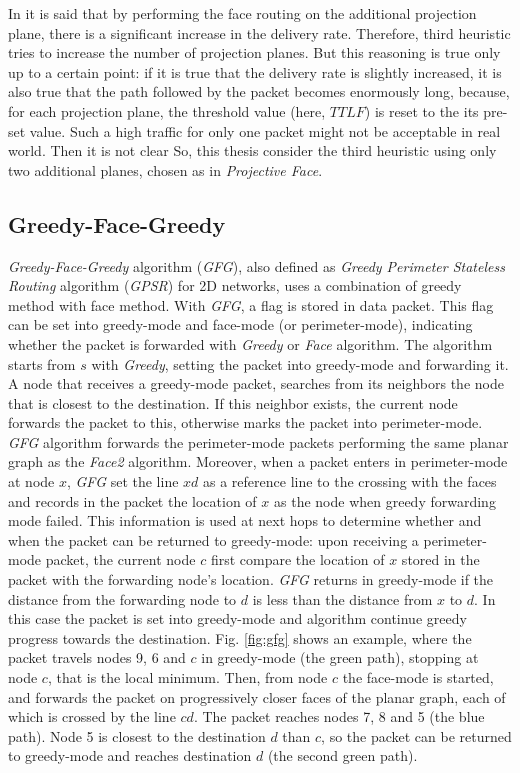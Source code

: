 \documentclass[journal,comsoc]{IEEEtran}
\begin{document}
In \cite{kao:nearly} it is said that by performing the face routing on the additional projection plane, there is a significant increase in the delivery rate. Therefore, third heuristic tries to increase the number of projection planes. But this reasoning is true only up to a certain point: if it is true that the delivery rate is slightly increased, it is also true that the path followed by the packet becomes enormously long, because, for each projection plane, the threshold value (here, \(TTLF\)) is reset to the its pre-set value. Such a high traffic for only one packet might not be acceptable in real world. Then it is not clear So, this thesis consider the third heuristic using only two additional planes, chosen as in \emph{Projective Face}.


\subsection{Greedy-Face-Greedy}
\emph{Greedy-Face-Greedy} algorithm (\emph{GFG}), also defined as \emph{Greedy Perimeter Stateless Routing} algorithm (\emph{GPSR}) for 2D networks, uses a combination of greedy method with face method.
With \emph{GFG}, a flag is stored in data packet. This flag can be set into greedy-mode and face-mode (or perimeter-mode), indicating whether the packet is forwarded with \emph{Greedy} or \emph{Face} algorithm. The algorithm starts from \(s\) with \emph{Greedy}, setting the packet into greedy-mode and forwarding it. A node that receives a greedy-mode packet, searches from its neighbors the node that is closest to the destination. If this neighbor exists, the current node forwards the packet to this, otherwise marks the packet into perimeter-mode.
\emph{GFG} algorithm forwards the perimeter-mode packets performing the same planar graph as the \emph{Face2} algorithm. Moreover, when a packet enters in perimeter-mode at node \(x\), \emph{GFG} set the line \(xd\) as a reference line to the crossing with the faces and records in the packet the location of \(x\) as the node when greedy forwarding mode failed. This information is used at next hops to determine whether and when the packet can be returned to greedy-mode: upon receiving a perimeter-mode packet, the current node \(c\) first compare the location of \(x\) stored in the packet with the forwarding node's location. \emph{GFG} returns in greedy-mode if the distance from the forwarding node to \(d\) is less than the distance from \(x\) to \(d\). In this case the packet is set into greedy-mode and algorithm continue greedy progress towards the destination. Fig. \ref{fig:gfg} shows an example, where the packet travels nodes 9, 6 and \(c\) in greedy-mode (the green path), stopping at node \(c\), that is the local minimum. Then, from node \(c\) the face-mode is started, and forwards the packet on progressively closer faces of the planar graph, each of which is crossed by the line \(cd\). The packet reaches nodes 7, 8 and 5 (the blue path). Node 5 is closest to the destination \(d\) than \(c\), so the packet can be returned to greedy-mode and reaches destination \(d\) (the second green path).
\end{document}
